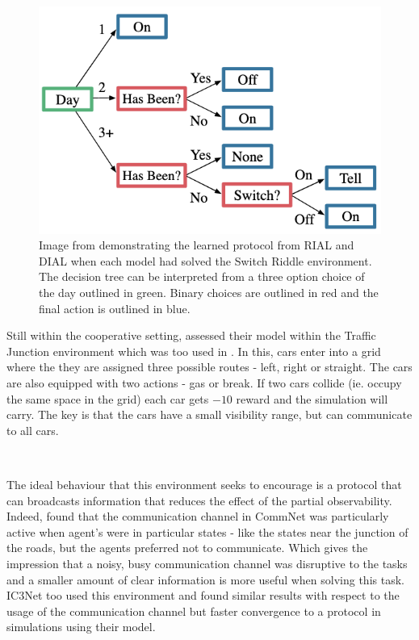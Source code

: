 \documentclass{article}
\begin{document}
\begin{figure}
	\centering
	\includegraphics[scale=0.8]{images/switch_riddle}
	\caption{Image from \citet{foerster2016learning} demonstrating the learned protocol from RIAL and DIAL when each model had solved the Switch Riddle environment. The decision tree can be interpreted from a three option choice of the day outlined in green. Binary choices are outlined in red and the final action is outlined in blue. }
	\label{fig:switch_riddle_solution}
\end{figure}

Still within the cooperative setting, \citet{sukhbaatar2016commnet} assessed their model within the Traffic Junction environment which was too used in \citet{singh2018ic3net}. In this, cars enter into a grid where the they are assigned three possible routes - left, right or straight. The cars are also equipped with two actions - gas or break. If two cars collide (ie. occupy the same space in the grid) each car gets $-10$ reward and the simulation will carry. The key is that the cars have a small visibility range, but can communicate to all cars.

\

The ideal behaviour that this environment seeks to encourage is a protocol that can broadcasts information that reduces the effect of the partial observability. Indeed, \citet{sukhbaatar2016commnet} found that the communication channel in CommNet was particularly active when agent's were in particular states - like the states near the junction of the roads, but the agents preferred not to communicate. Which gives the impression that a noisy, busy communication channel was disruptive to the tasks and a smaller amount of clear information is more useful when solving this task. IC3Net \citep{singh2018ic3net} too used this environment and found similar results with respect to the usage of the communication channel but faster convergence to a protocol in simulations using their model.
\end{document}

